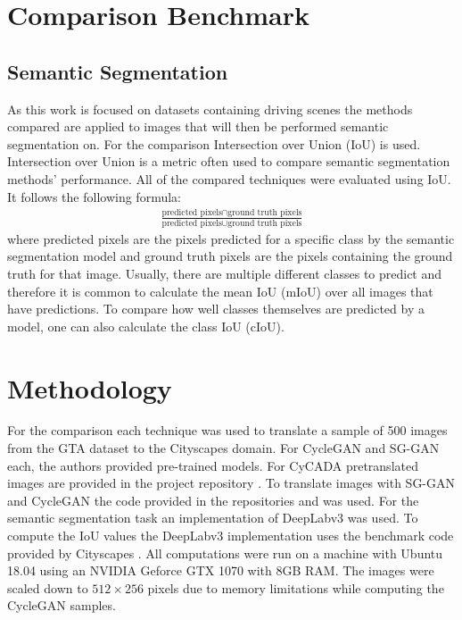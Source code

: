 \section{Comparison Benchmark}
\subsection{Semantic Segmentation}
As this work is focused on datasets containing driving scenes the methods compared are applied to images that will then be performed semantic segmentation on. For the comparison Intersection over Union (IoU) is used. Intersection over Union is a metric often used to compare semantic segmentation methods' performance. All of the compared techniques were evaluated using IoU. It follows the following formula:
\begin{align*}
	\frac{\text{predicted pixels} \cap \text{ground truth pixels}}{\text{predicted pixels} \cup \text{ground truth pixels}}
\end{align*}
where predicted pixels are the pixels predicted for a specific class by the semantic segmentation model and ground truth pixels are the pixels containing the ground truth for that image. Usually, there are multiple different classes to predict and therefore it is common to calculate the mean IoU (mIoU) over all images that have predictions. To compare how well classes themselves are predicted by a model, one can also calculate the class IoU (cIoU).

\section{Methodology}
For the comparison each technique was used to translate a sample of 500 images from the GTA dataset to the Cityscapes domain. For CycleGAN and SG-GAN each, the authors provided pre-trained models. For CyCADA pretranslated images are provided in the project repository \cite{CyCADA}. To translate images with SG-GAN and CycleGAN the code provided in the repositories \cite{SG} and \cite{Cycle} was used. For the semantic segmentation task an implementation \cite{DLR} of DeepLabv3 \cite{DBLP:journals/corr/ChenPSA17} was used. To compute the IoU values the DeepLabv3 implementation uses the benchmark code provided by Cityscapes \cite{CSR}. All computations were run on a machine with Ubuntu 18.04 using an NVIDIA Geforce GTX 1070 with 8GB RAM. The images were scaled down to $512 \times 256$ pixels due to memory limitations while computing the CycleGAN samples.


